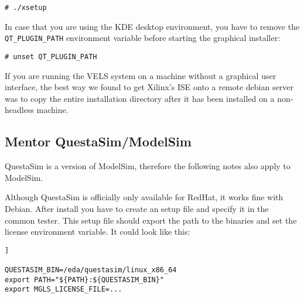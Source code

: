 \begin{verbatim}
# ./xsetup
\end{verbatim}

In case that you are using the KDE desktop environment, you have to remove the \verb!QT_PLUGIN_PATH! environment variable before starting the graphical installer:

\begin{verbatim}
# unset QT_PLUGIN_PATH
\end{verbatim}

If you are running the VELS system on a machine without a graphical user interface, the best way we found to get Xilinx's ISE onto a remote debian server was to copy the entire installation directory after it has been installed on a non-headless machine.

\subsection{Mentor QuestaSim/ModelSim}
QuestaSim is a version of ModelSim, therefore the following notes also apply to
ModelSim.

Although QuestaSim is officially only available for RedHat, it works fine with Debian.
After install you have to create an setup file and specify it in the common tester.
This setup file should export the path to the binaries and set the license environment
variable. It could look like this:
\begin{lstlisting}[frame=single,captionpos=b,caption=QuestaSimSetup.sh, belowcaptionskip=4pt]]

QUESTASIM_BIN=/eda/questasim/linux_x86_64
export PATH="${PATH}:${QUESTASIM_BIN}"
export MGLS_LICENSE_FILE=...
\end{lstlisting}






